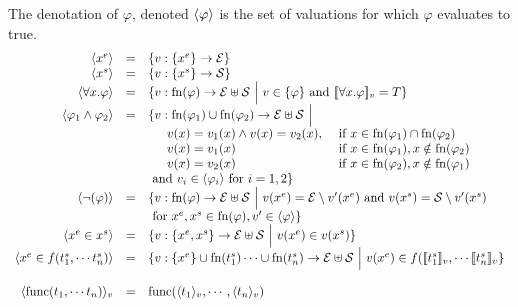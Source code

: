 The denotation of $\varphi$, denoted $\langle{\varphi}\rangle$ is the set of valuations for which $\varphi$ evaluates to true.
\[
\begin{array}{rcl}
  \langle{x^e}\rangle &=& \{v : \{x^e\}\to \mathcal{E}\}\\
  \langle{x^s}\rangle &=& \{v : \{x^s\}\to \mathcal{S}\}\\
  \langle{\forall x.\varphi}\rangle &=& \{v :\mathrm{fn}(\varphi)\to\mathcal{E}\uplus\mathcal{S} ~\Big|~ v \in \{\varphi\}\text{ and }[\![\forall x.\varphi]\!]_v= T\}\\
  \langle{\varphi_1 \wedge \varphi_2}\rangle &=& \{v: \mathrm{fn}(\varphi_1)\cup\mathrm{fn}(\varphi_2)\to\mathcal{E}\uplus\mathcal{S}~\Big|~ \\
  &&\begin{array}{ll}
  \quad v(x) = v_1(x)\wedge v(x) = v_2(x), &\text{ if }x\in\mathrm{fn}(\varphi_1)\cap\mathrm{fn}(\varphi_2)\\
  \quad v(x) = v_1(x) &\text{ if }x\in\mathrm{fn}(\varphi_1),x\notin\mathrm{fn}(\varphi_2)\\
  \quad v(x) = v_2(x) &\text{ if }x\in\mathrm{fn}(\varphi_2),x\notin\mathrm{fn}(\varphi_1)\\
  \end{array}\\
  &&\text{ and }v_i\in\langle{\varphi_i}\rangle\text{ for }i=1,2\}\\
  \langle{\neg(\varphi)}\rangle &=& \{v :\mathrm{fn}(\varphi)\to\mathcal{E}\uplus\mathcal{S} ~\Big|~ v(x^e) = \mathcal{E}\setminus v'(x^e)\text{ and }v(x^s) = \mathcal{S}\setminus v'(x^s)\\
  &&\text{ for }x^e, x^s\in \mathrm{fn}(\varphi), v'\in\langle{\varphi}\rangle\}
  \\
  \langle{ x^e\in x^s}\rangle &=& \{v :\{x^e,x^s\}\to\mathcal{E}\uplus\mathcal{S} ~\Big|~ v(x^e)\in v(x^s) \} \\
  \langle{ x^e\in f(t^s_1,\cdots t^s_n)}\rangle &=& \{v :\{x^e\}\cup\mathrm{fn}(t^s_1)\cdots\cup\mathrm{fn}(t^s_n)\to\mathcal{E}\uplus\mathcal{S} ~\Big|~ v(x^e)\in f([\![t^s_1]\!]_v,\cdots [\![t^s_n]\!]_v \} \\
  \\
  \langle{\text{func}(t_1,\cdots t_n)}\rangle_{v} &=& \text{func}(\langle{t_1}\rangle_{v},\cdots,\langle{t_n}\rangle_{v}) \\
\end{array}
\]
